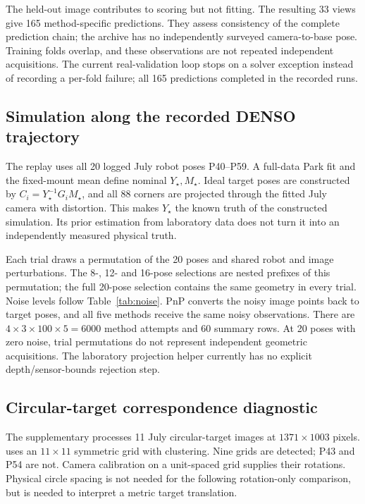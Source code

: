 \documentclass[12pt,a4paper]{article}
\newcommand{\code}[1]{\texttt{\detokenize{#1}}}
\begin{document}
The held-out image contributes to scoring but not fitting. The resulting 33 views give 165 method-specific predictions. They assess consistency of the complete prediction chain; the archive has no independently surveyed camera-to-base pose. Training folds overlap, and these observations are not repeated independent acquisitions. The current real-validation loop stops on a solver exception instead of recording a per-fold failure; all 165 predictions completed in the recorded runs. \cite{experimentcode,eauncertainty}

\subsection{Simulation along the recorded DENSO trajectory}\label{sec:replay}
The replay uses all 20 logged July robot poses P40--P59. A full-data Park fit and the fixed-mount mean define nominal $Y_\star,M_\star$. Ideal target poses are constructed by $C_i=Y_\star^{-1}G_iM_\star$, and all 88 corners are projected through the fitted July camera with distortion. This makes $Y_\star$ the known truth of the constructed simulation. Its prior estimation from laboratory data does not turn it into an independently measured physical truth. \cite{experimentcode}

Each trial draws a permutation of the 20 poses and shared robot and image perturbations. The 8-, 12- and 16-pose selections are nested prefixes of this permutation; the full 20-pose selection contains the same geometry in every trial. Noise levels follow Table~\ref{tab:noise}. PnP converts the noisy image points back to target poses, and all five methods receive the same noisy observations. There are $4\times3\times100\times5=6000$ method attempts and 60 summary rows. At 20 poses with zero noise, trial permutations do not represent independent geometric acquisitions. The laboratory projection helper currently has no explicit depth/sensor-bounds rejection step. \cite{experimentcode}

\subsection{Circular-target correspondence diagnostic}\label{sec:circles}
The supplementary \code{circle_diagnostic.py} processes 11 July circular-target images at $1371\times1003$ pixels. \code{findCirclesGrid} uses an $11\times11$ symmetric grid with clustering. Nine grids are detected; P43 and P54 are not. Camera calibration on a unit-spaced grid supplies their rotations. Physical circle spacing is not needed for the following rotation-only comparison, but is needed to interpret a metric target translation. \cite{experimentcode,opencv}
\end{document}
